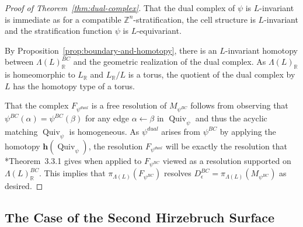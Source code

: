 \documentclass{amsart}
\newcommand{\ZZ}{\mathbb{Z}}
\newcommand{\RR}{\mathbb{R}}
\newcommand{\homotopy}{\mathbf{h}}
\newcommand{\Mepsilon}{D^{BC}_{\epsilon}}
\newcommand{\Quiv}{\operatorname{Quiv}}
\theoremstyle{remark}
\begin{document}
\begin{proof}[Proof of Theorem~\ref{thm:dual-complex}]
  That the dual complex of $\psi$ is $L$-invariant is immediate as for a compatible $\ZZ^n$-stratification, the cell structure is $L$-invariant and the stratification function $\psi$ is $L$-equivariant.
  
  By Proposition~\ref{prop:boundary-and-homotopy}, there is an $L$-invariant homotopy between $\Lambda(L)_{\RR}^{BC}$ and the geometric realization of the dual complex. As $\Lambda(L)_{\RR}$ is homeomorphic to $L_{\RR}$ and $L_{\RR}/L$ is a torus, the quotient of the dual complex by $L$ has the homotopy type of a torus.
  
  That the complex $F_{\psi^{dual}}$ is a free resolution of $M_{\psi^{BC}}$ follows from observing that $\psi^{BC}(\alpha)=\psi^{BC}(\beta)$ for any edge $\alpha\leftarrow \beta$ in $ \Quiv_\psi$ and thus the acyclic matching $\Quiv_\psi$ is homogeneous. As $\psi^{dual}$ arises from $\psi^{BC}$ by applying the homotopy $\homotopy(\Quiv_\psi)$, the resolution $F_{\psi^{dual}}$ will be exactly the resolution that \cite{Batzies}*{Theorem~3.3.1} gives when applied to $F_{\psi^{BC}}$ viewed as a resolution supported on $\Lambda(L)_{\RR}^{BC}$. This implies that $\pi_{\Lambda(L)}(F_{\psi^{BC}})$ resolves $\Mepsilon = \pi_{\Lambda(L)}(M_{\psi^{BC}})$ as desired.
\end{proof}

\subsection*{The Case of the Second Hirzebruch Surface}
\end{document}
